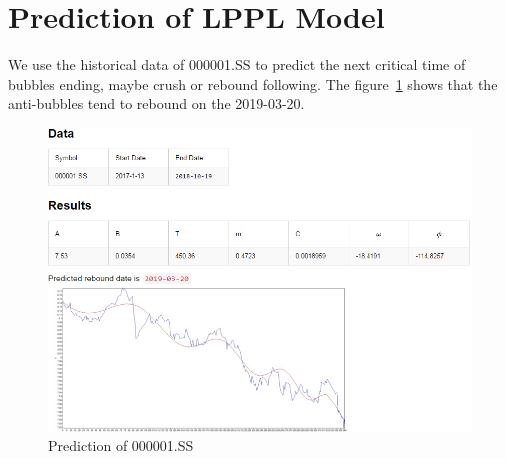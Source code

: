 \section{Prediction of LPPL  Model}
We use the historical data of 000001.SS to predict the next critical time of bubbles ending, maybe crush or rebound following. The figure~\ref{F:LPPL-prediction} shows that the anti-bubbles tend to rebound on the 2019-03-20.
\begin{figure}[H]
    \centering
    \includegraphics[width=\textwidth]{figures/2019-10-22-LPPL.png}
    \caption{Prediction of 000001.SS}
    \label{F:LPPL-prediction}
\end{figure}
